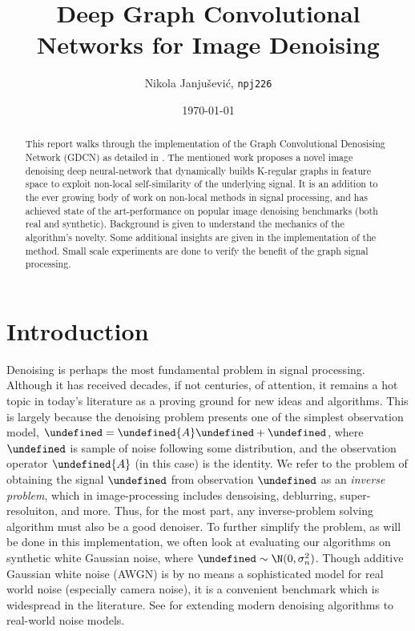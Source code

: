 \documentclass[12pt,a4paper,reqno]{amsart}
\title{Deep Graph Convolutional Networks for Image Denoising}
\author{Nikola Janju\v{s}evi\'{c}, \texttt{npj226}}
\date{\today}
\let\bm\undefined
\newcommand{\bm}[1]{\mathbf{#1}}
\let\x\undefined
\newcommand{\x}{\bm{x}}
\let\y\undefined
\newcommand{\y}{\bm{y}}
\let\n\undefined
\newcommand{\n}{\bm{n}}
\begin{document}
\begin{abstract}
This report walks through the implementation of the Graph Convolutional
Denosising Network (GDCN) as detailed in \cite{ValsesiaICIP19}. The mentioned
work proposes a novel image denoising deep neural-network that dynamically
builds K-regular graphs in feature space to exploit non-local self-similarity of
the underlying signal. It is an addition to the ever growing body of work on
non-local methods in signal processing, and has achieved state of the
art-performance on popular image denoising benchmarks (both real and synthetic). 
Background is given to understand the mechanics of the algorithm's novelty.
Some additional insights are given in the implementation of the method.
Small scale experiments are done to verify the benefit of the graph signal
processing. 
\end{abstract}

\maketitle

\section{Introduction}
Denoising is perhaps the most fundamental problem in signal processing. Although
it has received decades, if not centuries, of attention, it remains a hot
topic in today's literature as a proving ground for new ideas and algorithms.
This is largely because the denoising problem presents one of the simplest
observation model, $\y = \bm{A}\x + \n$, where $\n$ is sample of noise following
some distribution, and the observation operator $\bm{A}$ (in this case) is the
identity. We refer to the problem of obtaining the signal $\x$ from observation
$\y$ as an \textit{inverse problem}, which in image-processing includes
densoising, deblurring, super-resoluiton, and more. Thus, for the most part, any
inverse-problem solving algorithm must also be a good denoiser. To further
simplify the problem, as will be done in this implementation, we often look at
evaluating our algorithms on synthetic white Gaussian noise, where $\n \sim
\N(0,\sigma_n^2)$. Though additive Gaussian white noise (AWGN) is by no means a
sophisticated model for real world noise (especially camera noise), it is a
convenient benchmark which is widespread in the literature. See
\cite{real_denoising_refs} for extending modern denoising algorithms to
real-world noise models. \\
\end{document}
